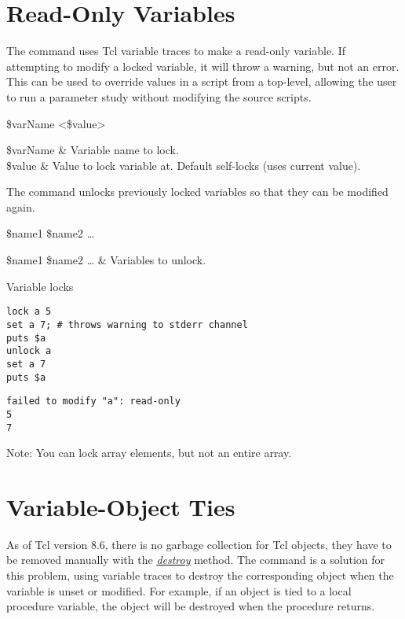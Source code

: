\documentclass{article}
\begin{document}
\clearpage
\section{Read-Only Variables}
The command  uses Tcl variable traces to make a read-only variable. 
If attempting to modify a locked variable, it will throw a warning, but not an error.
This can be used to override values in a script from a top-level, allowing the user to run a parameter study without modifying the source scripts.

\begin{syntax}
 \$varName <\$value>
\end{syntax}
\begin{args}
\$varName & Variable name to lock.  \\
\$value & Value to lock variable at. Default self-locks (uses current value).
\end{args}

The command  unlocks previously locked variables so that they can be modified again.
\begin{syntax}
 \$name1 \$name2 …
\end{syntax}
\begin{args}
\$name1 \$name2 … & Variables to unlock.
\end{args}

\begin{example}{Variable locks}
\begin{lstlisting}
lock a 5
set a 7; # throws warning to stderr channel
puts $a
unlock a
set a 7
puts $a
\end{lstlisting}
\tcblower
\begin{lstlisting}
failed to modify "a": read-only
5
7
\end{lstlisting}
\end{example}

Note: You can lock array elements, but not an entire array.

\clearpage
\section{Variable-Object Ties}
As of Tcl version 8.6, there is no garbage collection for Tcl objects, they have to be removed manually with the \textit{\href{https://www.tcl.tk/man/tcl8.6/TclCmd/object.html}{destroy}} method. 
The command  is a solution for this problem, using variable traces to destroy the corresponding object when the variable is unset or modified. 
For example, if an object is tied to a local procedure variable, the object will be destroyed when the procedure returns.
\end{document}
